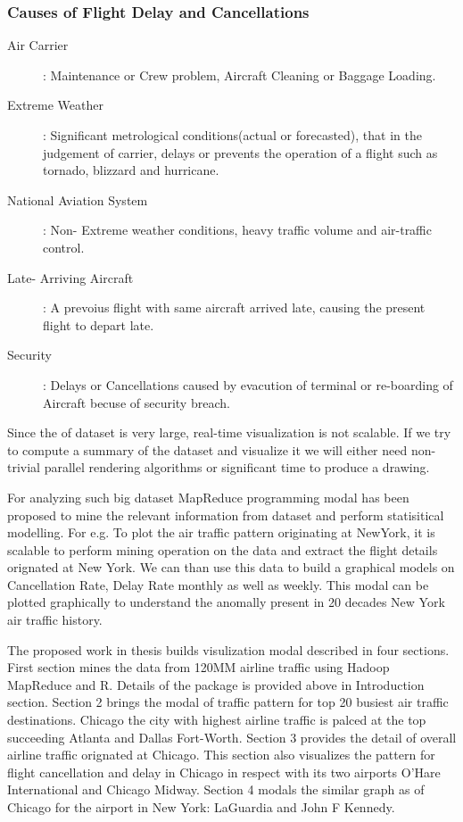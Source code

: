 \subsubsection{Causes of Flight Delay and Cancellations}
\begin{description}
\item[Air Carrier]: Maintenance or Crew problem, Aircraft Cleaning or Baggage Loading.
\item[Extreme Weather]: Significant metrological conditions(actual or forecasted), that in the judgement of carrier, delays or prevents the operation of a flight such as tornado, blizzard and hurricane.
\item[National Aviation System]: Non- Extreme weather conditions, heavy traffic volume and air-traffic control.
\item[Late- Arriving Aircraft]: A prevoius flight with same aircraft arrived late, causing the present flight to depart late.
\item[Security]: Delays or Cancellations caused by evacution of terminal or re-boarding of Aircraft becuse of security breach.
\end{description}

Since the of dataset is very large, real-time visualization is not scalable. If we try to compute a summary of the dataset and visualize it we will either need non-trivial parallel rendering algorithms or significant time to produce a drawing.

For analyzing such big dataset MapReduce programming modal has been proposed to mine the relevant information from dataset and perform statisitical modelling. For e.g. To plot the air traffic pattern originating at NewYork, it is scalable to perform mining operation on the data and extract the flight details orignated at New York. We can than use this data to build a graphical models on Cancellation Rate, Delay Rate monthly as  well as weekly. This modal can be plotted graphically to understand the anomally present in 20 decades New York air traffic history.

The proposed work in thesis builds visulization modal described in four sections. First section mines the data from 120MM airline traffic using Hadoop MapReduce and R. Details of the package is provided above in Introduction section. Section 2 brings the modal of traffic pattern for top 20 busiest air traffic destinations. Chicago the city with highest airline traffic is palced at the top succeeding Atlanta and Dallas Fort-Worth. Section 3 provides the detail of overall airline traffic orignated at Chicago. This section also visualizes the pattern for flight cancellation and delay in Chicago in respect with its two airports O'Hare International and Chicago Midway. Section 4 modals the similar graph as of Chicago for the airport in New York: LaGuardia and John F Kennedy.

